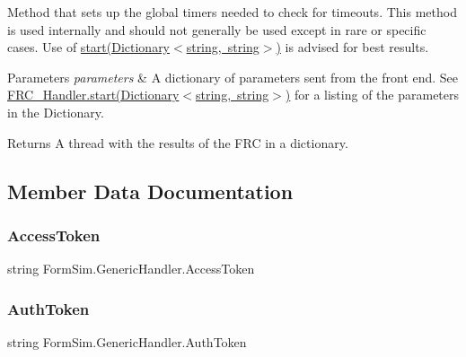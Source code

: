 Method that sets up the global timers needed to check for timeouts. This method is used internally and should not generally be used except in rare or specific cases. Use of \mbox{\hyperlink{class_form_sim_1_1_generic_handler_affac9485687a2be1595405d657922532}{start(\+Dictionary$<$string, string$>$)}} is advised for best results. 


\begin{DoxyParams}{Parameters}
{\em parameters} & A dictionary of parameters sent from the front end. See \mbox{\hyperlink{interface_form_sim_1_1_f_r_c___handler_a2a2a8a776e774e5f8b5e2b7e623a26a6}{F\+R\+C\+\_\+\+Handler.\+start(\+Dictionary$<$string, string$>$)}} for a listing of the parameters in the Dictionary.\\
\hline
\end{DoxyParams}
\begin{DoxyReturn}{Returns}
A thread with the results of the F\+RC in a dictionary.
\end{DoxyReturn}


\subsection{Member Data Documentation}
\mbox{\label{class_form_sim_1_1_generic_handler_ad47864be2c5790106a7538f640b2792f}} 
\subsubsection{\texorpdfstring{Access\+Token}{AccessToken}}
{\footnotesize\ttfamily string Form\+Sim.\+Generic\+Handler.\+Access\+Token\hspace{0.3cm}{\ttfamily [protected]}}

\mbox{\label{class_form_sim_1_1_generic_handler_a6699d8bfc9cd305baf30ab9413b21605}} 
\subsubsection{\texorpdfstring{Auth\+Token}{AuthToken}}
{\footnotesize\ttfamily string Form\+Sim.\+Generic\+Handler.\+Auth\+Token\hspace{0.3cm}{\ttfamily [protected]}}

